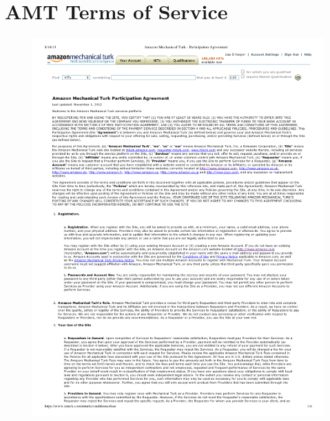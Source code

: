 
\chapter{AMT Terms of Service}
\label{amazon}
\begin{figure}[h!]
\centerline{
\includegraphics[scale=.6]{Appendices/amt-tos}
}
\end{figure}

